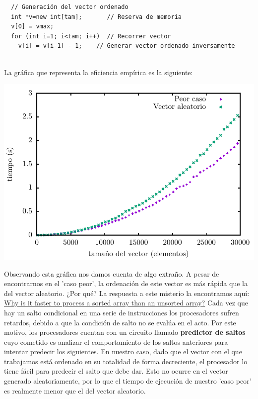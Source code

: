 \documentclass[11pt,a4paper]{article}
\begin{document}
\begin{lstlisting}
  // Generación del vector ordenado
  int *v=new int[tam];       // Reserva de memoria
  v[0] = vmax;
  for (int i=1; i<tam; i++)  // Recorrer vector
    v[i] = v[i-1] - 1;    // Generar vector ordenado inversamente
\end{lstlisting}
\hfill \\
La gráfica que representa la eficiencia empírica es la siguiente:

\begin{center}
	\includegraphics{img/tiempos_burbuja_peor_caso.pdf}
\end{center}

\hypersetup{linkcolor=green}

Observando esta gráfica nos damos cuenta de algo extraño. A pesar de encontrarnos en el 'caso peor', la ordenación de este vector es más rápida que la del vector aleatorio. ¿Por qué? La respuesta a este misterio la encontramos aquí: \href{http://stackoverflow.com/questions/11227809/why-is-it-faster-to-process-a-sorted-array-than-an-unsorted-array}{Why is it faster to process a sorted array than an unsorted array?} Cada vez que hay un salto condicional en una serie de instrucciones los procesadores sufren retardos, debido a que la condición de salto no se evalúa en el acto. Por este motivo, los procesadores cuentan con un circuito llamado \textbf{predictor de saltos} cuyo cometido es analizar el comportamiento de los saltos anteriores para intentar predecir los siguientes. En nuestro caso, dado que el vector con el que trabajamos está ordenado en su totalidad de forma decreciente, el procesador lo tiene fácil para predecir el salto que debe dar. Esto no ocurre en el vector generado aleatoriamente, por lo que el tiempo de ejecución de nuestro 'caso peor' es realmente menor que el del vector aleatorio.
\end{document}
